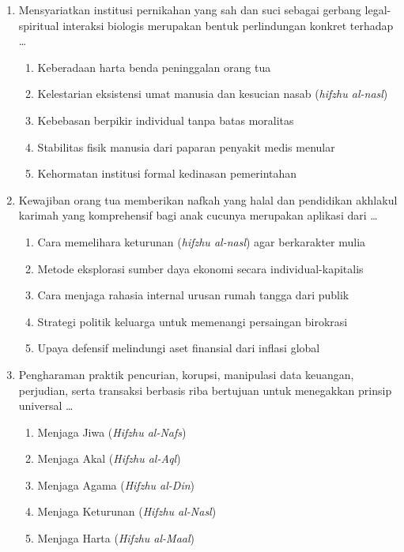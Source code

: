 \documentclass[12pt,a4paper]{article}
\begin{document}
\begin{enumerate}[leftmargin=*]
\item Mensyariatkan institusi pernikahan yang sah dan suci sebagai gerbang legal-spiritual interaksi biologis merupakan bentuk perlindungan konkret terhadap \dots
    \begin{enumerate}[label=\alph*.]
        \item Keberadaan harta benda peninggalan orang tua
        \item Kelestarian eksistensi umat manusia dan kesucian nasab (\textit{hifzhu al-nasl})
        \item Kebebasan berpikir individual tanpa batas moralitas
        \item Stabilitas fisik manusia dari paparan penyakit medis menular
        \item Kehormatan institusi formal kedinasan pemerintahan
    \end{enumerate}

\item Kewajiban orang tua memberikan nafkah yang halal dan pendidikan akhlakul karimah yang komprehensif bagi anak cucunya merupakan aplikasi dari \dots
    \begin{enumerate}[label=\alph*.]
        \item Cara memelihara keturunan (\textit{hifzhu al-nasl}) agar berkarakter mulia
        \item Metode eksplorasi sumber daya ekonomi secara individual-kapitalis
        \item Cara menjaga rahasia internal urusan rumah tangga dari publik
        \item Strategi politik keluarga untuk memenangi persaingan birokrasi
        \item Upaya defensif melindungi aset finansial dari inflasi global
    \end{enumerate}

\item Pengharaman praktik pencurian, korupsi, manipulasi data keuangan, perjudian, serta transaksi berbasis riba bertujuan untuk menegakkan prinsip universal \dots
    \begin{enumerate}[label=\alph*.]
        \item Menjaga Jiwa (\textit{Hifzhu al-Nafs})
        \item Menjaga Akal (\textit{Hifzhu al-Aql})
        \item Menjaga Agama (\textit{Hifzhu al-Din})
        \item Menjaga Keturunan (\textit{Hifzhu al-Nasl})
        \item Menjaga Harta (\textit{Hifzhu al-Maal})
    \end{enumerate}


\end{enumerate}
\end{document}
